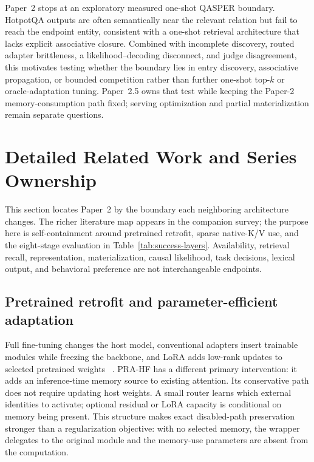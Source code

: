 \documentclass[11pt]{article}
\begin{document}
Paper~2 stops at an exploratory measured one-shot QASPER boundary. HotpotQA outputs are often
semantically near the relevant relation but fail to reach the endpoint entity, consistent with a
one-shot retrieval architecture that lacks explicit associative closure. Combined with incomplete
discovery, routed adapter brittleness, a likelihood--decoding disconnect, and judge disagreement,
this motivates testing whether the boundary lies in entry discovery, associative propagation, or
bounded competition rather than further one-shot top-$k$ or oracle-adaptation tuning. Paper~2.5
owns that test while keeping the Paper-2 memory-consumption path fixed; serving optimization and
partial materialization remain separate questions.

\section{Detailed Related Work and Series Ownership}
\label{app:related-work}

This section locates Paper~2 by the boundary each neighboring architecture changes. The richer
literature map appears in the companion survey; the purpose here is self-containment around
pretrained retrofit, sparse native-K/V use, and the eight-stage evaluation in
Table~\ref{tab:success-layers}. Availability, retrieval recall, representation, materialization,
causal likelihood, task decisions, lexical output, and behavioral preference are not
interchangeable endpoints.

\subsection{Pretrained retrofit and parameter-efficient adaptation}

Full fine-tuning changes the host model, conventional adapters insert trainable modules while
freezing the backbone, and LoRA adds low-rank updates to selected pretrained weights
~\cite{houlsby2019adapters,hu2022lora}. PRA-HF has a different primary intervention: it adds an
inference-time memory source to existing attention. Its conservative path does not require
updating host weights. A small router learns which external identities to activate; optional
residual or LoRA capacity is conditional on memory being present. This structure makes exact
disabled-path preservation stronger than a regularization objective: with no selected memory,
the wrapper delegates to the original module and the memory-use parameters are absent from the
computation.
\end{document}
